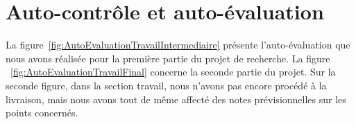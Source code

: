 \documentclass[11pt, french]{report-rd-info}
\begin{document}
\newpage
\printweeksummary
\chapter{Auto-contrôle et auto-évaluation}
La figure~\ref{fig:AutoEvaluationTravailIntermediaire} présente l'auto-évaluation que nous avons réalisée pour la première partie du projet de recherche. La figure ~\ref{fig:AutoEvaluationTravailFinal} concerne la seconde partie du projet. Sur la seconde figure, dans la section travail, nous n'avons pas encore procédé à la livraison, mais nous avons tout de même affecté des notes prévisionnelles sur les points concernés. 
\begin{figure}
	\centering
     \ifscreen %

\end{figure}
\end{document}

